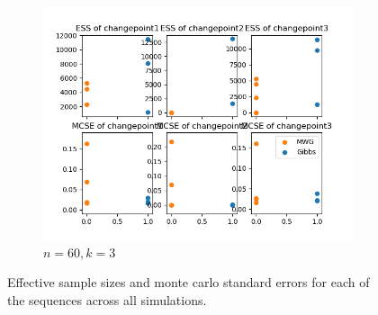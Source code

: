 \begin{figure}[H]
\begin{subfigure}{.3\textwidth}
    	\includegraphics[width=\linewidth]{../../plots/ess_se_M4_N60_NMCMC3_seed0_diffind2.png}
    	\caption{$n=60, k=3$}
	\end{subfigure}
	\caption{Effective sample sizes and monte carlo standard errors for each of the sequences across all simulations.}
\end{figure}